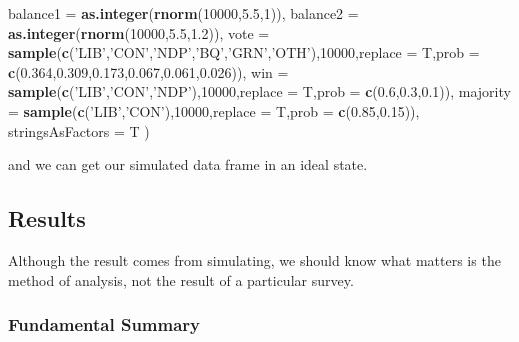 \documentclass[
]{article}
\newenvironment{Shaded}{\begin{snugshade}}{\end{snugshade}}
\newcommand{\DataTypeTok}[1]{\textcolor[rgb]{0.13,0.29,0.53}{#1}}
\newcommand{\DecValTok}[1]{\textcolor[rgb]{0.00,0.00,0.81}{#1}}
\newcommand{\FloatTok}[1]{\textcolor[rgb]{0.00,0.00,0.81}{#1}}
\newcommand{\KeywordTok}[1]{\textcolor[rgb]{0.13,0.29,0.53}{\textbf{#1}}}
\newcommand{\NormalTok}[1]{#1}
\newcommand{\StringTok}[1]{\textcolor[rgb]{0.31,0.60,0.02}{#1}}
\begin{document}
\begin{Shaded}
\begin{Highlighting}[]
  \DataTypeTok{balance1 =} \KeywordTok{as.integer}\NormalTok{(}\KeywordTok{rnorm}\NormalTok{(}\DecValTok{10000}\NormalTok{,}\FloatTok{5.5}\NormalTok{,}\DecValTok{1}\NormalTok{)),}
  \DataTypeTok{balance2 =} \KeywordTok{as.integer}\NormalTok{(}\KeywordTok{rnorm}\NormalTok{(}\DecValTok{10000}\NormalTok{,}\FloatTok{5.5}\NormalTok{,}\FloatTok{1.2}\NormalTok{)),}
  \DataTypeTok{vote =} \KeywordTok{sample}\NormalTok{(}\KeywordTok{c}\NormalTok{(}\StringTok{'LIB'}\NormalTok{,}\StringTok{'CON'}\NormalTok{,}\StringTok{'NDP'}\NormalTok{,}\StringTok{'BQ'}\NormalTok{,}\StringTok{'GRN'}\NormalTok{,}\StringTok{'OTH'}\NormalTok{),}\DecValTok{10000}\NormalTok{,}\DataTypeTok{replace =}\NormalTok{ T,}\DataTypeTok{prob =} \KeywordTok{c}\NormalTok{(}\FloatTok{0.364}\NormalTok{,}\FloatTok{0.309}\NormalTok{,}\FloatTok{0.173}\NormalTok{,}\FloatTok{0.067}\NormalTok{,}\FloatTok{0.061}\NormalTok{,}\FloatTok{0.026}\NormalTok{)),}
  \DataTypeTok{win =} \KeywordTok{sample}\NormalTok{(}\KeywordTok{c}\NormalTok{(}\StringTok{'LIB'}\NormalTok{,}\StringTok{'CON'}\NormalTok{,}\StringTok{'NDP'}\NormalTok{),}\DecValTok{10000}\NormalTok{,}\DataTypeTok{replace =}\NormalTok{ T,}\DataTypeTok{prob =} \KeywordTok{c}\NormalTok{(}\FloatTok{0.6}\NormalTok{,}\FloatTok{0.3}\NormalTok{,}\FloatTok{0.1}\NormalTok{)),}
  \DataTypeTok{majority =} \KeywordTok{sample}\NormalTok{(}\KeywordTok{c}\NormalTok{(}\StringTok{'LIB'}\NormalTok{,}\StringTok{'CON'}\NormalTok{),}\DecValTok{10000}\NormalTok{,}\DataTypeTok{replace =}\NormalTok{ T,}\DataTypeTok{prob =} \KeywordTok{c}\NormalTok{(}\FloatTok{0.85}\NormalTok{,}\FloatTok{0.15}\NormalTok{)),}
  \DataTypeTok{stringsAsFactors =}\NormalTok{ T}
\NormalTok{)}
\end{Highlighting}
\end{Shaded}

and we can get our simulated data frame in an ideal state.

\hypertarget{results}{%
\subsection{Results}\label{results}}

Although the result comes from simulating, we should know what matters
is the method of analysis, not the result of a particular survey.

\hypertarget{fundamental-summary}{%
\subsubsection{Fundamental Summary}\label{fundamental-summary}}
\end{document}
